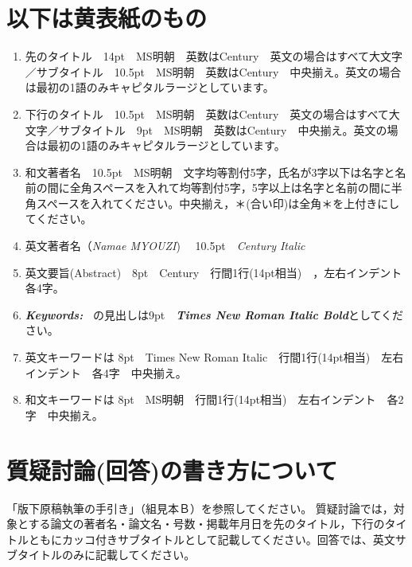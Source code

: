 \documentclass[base=11pt,magstyle=real,a4paper,twocolumn,xelatex,pandoc,jafont=ms]{bxjsarticle}
\begin{document}
	\section{以下は黄表紙のもの}
	\begin{enumerate}
		\renewcommand{\labelenumi}{$ \textcircled{\scriptsize\arabic{enumi}} $}%
		\item 先のタイトル　14pt　MS明朝　英数はCentury　英文の場合はすべて大文字／サブタイトル　10.5pt　MS明朝　英数はCentury　中央揃え。英文の場合は最初の1語のみキャピタルラージとしています。
		
		\item 下行のタイトル　10.5pt　MS明朝　英数はCentury　英文の場合はすべて大文字／サブタイトル　9pt　MS明朝　英数はCentury　中央揃え。英文の場合は最初の1語のみキャピタルラージとしています。
		
		\item 和文著者名　10.5pt　MS明朝　文字均等割付5字，氏名が3字以下は名字と名前の間に全角スペースを入れて均等割付5字，5字以上は名字と名前の間に半角スペースを入れてください。中央揃え，＊(合い印)は全角＊を上付きにしてください。
		
		\item 英文著者名（\textit{Namae MYOUZI})　 10.5pt　\textit{Century Italic}  
		
		\item 英文要旨(Abstract)　8pt　Century　行間1行(14pt相当)　，左右インデント　各4字。	
		
		\item {\timesnewroman\textit {\textbf{Keywords:~}}} の見出しは9pt　{\timesnewroman\textit {\textbf{Times New Roman Italic Bold}}}としてください。

		\item 英文キーワードは 8pt　Times New Roman Italic　行間1行(14pt相当)　左右インデント　各4字　中央揃え。

		\item 和文キーワードは 8pt　MS明朝　行間1行(14pt相当)　左右インデント　各2字　中央揃え。
		
	\end{enumerate}

\section{質疑討論(回答)の書き方について}
「版下原稿執筆の手引き」（組見本Ｂ）を参照してください。
質疑討論では，対象とする論文の著者名・論文名・号数・掲載年月日を先のタイトル，下行のタイトルともにカッコ付きサブタイトルとして記載してください。回答では、英文サブタイトルのみに記載してください。
\end{document}
